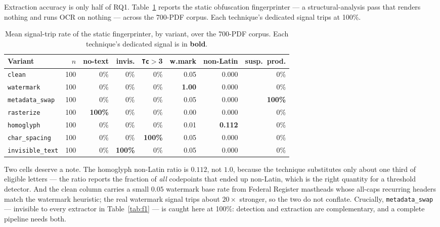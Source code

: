 \documentclass[11pt]{article}
\newcommand{\variant}[1]{\texttt{#1}}
\begin{document}
Extraction accuracy is only half of RQ1. Table~\ref{tab:fingerprint}
reports the static obfuscation fingerprinter --- a structural-analysis
pass that renders nothing and runs OCR on nothing --- across the 700-PDF
corpus. Each technique's dedicated signal trips at 100\%.

\begin{table}[tbp]
\centering
\caption{Mean signal-trip rate of the static fingerprinter, by variant,
  over the 700-PDF corpus. Each technique's dedicated signal is in
  \textbf{bold}.}
\label{tab:fingerprint}
\footnotesize
\setlength{\tabcolsep}{5pt}
\begin{tabular}{@{}l r r r r r r r@{}}
\toprule
\textbf{Variant} & $n$ & no-text & invis. & \texttt{Tc}$>$3 &
  w.mark & non-Latin & susp.\ prod.\\
\midrule
\variant{clean}          & 100 & 0\% & 0\% & 0\% & 0.05 & 0.000 & 0\%\\
\variant{watermark}      & 100 & 0\% & 0\% & 0\% & \textbf{1.00} & 0.000 & 0\%\\
\variant{metadata\_swap} & 100 & 0\% & 0\% & 0\% & 0.05 & 0.000 & \textbf{100\%}\\
\variant{rasterize}      & 100 & \textbf{100\%} & 0\% & 0\% & 0.00 & 0.000 & 0\%\\
\variant{homoglyph}      & 100 & 0\% & 0\% & 0\% & 0.01 & \textbf{0.112} & 0\%\\
\variant{char\_spacing}  & 100 & 0\% & 0\% & \textbf{100\%} & 0.05 & 0.000 & 0\%\\
\variant{invisible\_text}& 100 & 0\% & \textbf{100\%} & 0\% & 0.05 & 0.000 & 0\%\\
\bottomrule
\end{tabular}
\end{table}

Two cells deserve a note. The homoglyph non-Latin ratio is $0.112$, not
$1.0$, because the technique substitutes only about one third of
eligible letters --- the ratio reports the fraction of \emph{all}
codepoints that ended up non-Latin, which is the right quantity for a
threshold detector. And the clean column carries a small $0.05$
watermark base rate from Federal Register mastheads whose all-caps
recurring headers match the watermark heuristic; the real watermark
signal trips about $20\times$ stronger, so the two do not conflate.
Crucially, \variant{metadata\_swap} --- invisible to every extractor in
Table~\ref{tab:f1} --- is caught here at 100\%: detection and extraction
are complementary, and a complete pipeline needs both.
\end{document}

